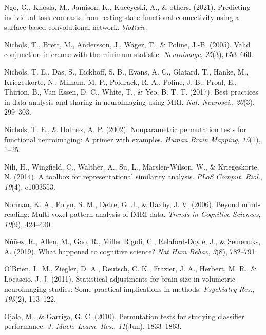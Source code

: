 \documentclass[11pt,american,a4paper,oneside,]{memoir} %
\begin{document}
\leavevmode\hypertarget{ref-Ngo2021-kf}{}%
Ngo, G., Khosla, M., Jamison, K., Kuceyeski, A., \& others. (2021). Predicting individual task contrasts from resting-state functional connectivity using a surface-based convolutional network. \emph{bioRxiv}.

\leavevmode\hypertarget{ref-nichols2005valid}{}%
Nichols, T., Brett, M., Andersson, J., Wager, T., \& Poline, J.-B. (2005). Valid conjunction inference with the minimum statistic. \emph{Neuroimage}, \emph{25}(3), 653--660.

\leavevmode\hypertarget{ref-Nichols2017-ze}{}%
Nichols, T. E., Das, S., Eickhoff, S. B., Evans, A. C., Glatard, T., Hanke, M., Kriegeskorte, N., Milham, M. P., Poldrack, R. A., Poline, J.-B., Proal, E., Thirion, B., Van Essen, D. C., White, T., \& Yeo, B. T. T. (2017). Best practices in data analysis and sharing in neuroimaging using MRI. \emph{Nat. Neurosci.}, \emph{20}(3), 299--303.

\leavevmode\hypertarget{ref-nichols2002nonparametric}{}%
Nichols, T. E., \& Holmes, A. P. (2002). Nonparametric permutation tests for functional neuroimaging: A primer with examples. \emph{Human Brain Mapping}, \emph{15}(1), 1--25.

\leavevmode\hypertarget{ref-Nili2014-ar}{}%
Nili, H., Wingfield, C., Walther, A., Su, L., Marslen-Wilson, W., \& Kriegeskorte, N. (2014). A toolbox for representational similarity analysis. \emph{PLoS Comput. Biol.}, \emph{10}(4), e1003553.

\leavevmode\hypertarget{ref-norman2006beyond}{}%
Norman, K. A., Polyn, S. M., Detre, G. J., \& Haxby, J. V. (2006). Beyond mind-reading: Multi-voxel pattern analysis of fMRI data. \emph{Trends in Cognitive Sciences}, \emph{10}(9), 424--430.

\leavevmode\hypertarget{ref-Nunez2019-lh}{}%
Núñez, R., Allen, M., Gao, R., Miller Rigoli, C., Relaford-Doyle, J., \& Semenuks, A. (2019). What happened to cognitive science? \emph{Nat Hum Behav}, \emph{3}(8), 782--791.

\leavevmode\hypertarget{ref-OBrien2011-lj}{}%
O'Brien, L. M., Ziegler, D. A., Deutsch, C. K., Frazier, J. A., Herbert, M. R., \& Locascio, J. J. (2011). Statistical adjustments for brain size in volumetric neuroimaging studies: Some practical implications in methods. \emph{Psychiatry Res.}, \emph{193}(2), 113--122.

\leavevmode\hypertarget{ref-Ojala2010-rc}{}%
Ojala, M., \& Garriga, G. C. (2010). Permutation tests for studying classifier performance. \emph{J. Mach. Learn. Res.}, \emph{11}(Jun), 1833--1863.
\end{document}
